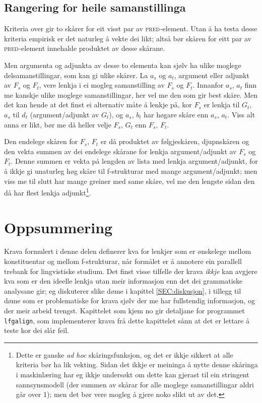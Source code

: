 \documentclass[12pt,a4paper,oneside,draft]{report}
\newcommand{\F}[2]{\textsc{#1}\ensuremath{_{#2}}}
\newcommand{\PRED}{\F{pred}{}}
\begin{document}
\subsection{Rangering for heile samanstillinga}
\label{sec-3.8.3}

Kriteria over gir to skårer for eit visst par av \PRED{}-element. Utan å
ha testa desse kriteria empirisk er det naturleg å vekte dei likt;
altså bør skåren for eitt par av \PRED{}-element innehalde produktet av
desse skårane.

Men argumenta og adjunkta av desse to elementa kan sjølv ha ulike
moglege delsamanstillingar, som kan gi ulike skårer. La $a_s$ og
$a_t$, argument eller adjunkt av $F_s$ og $F_t$, vere lenkja i ei
mogleg samanstilling av $F_s$ og $F_t$. Innanfor $a_s$, $a_t$ finn me
kanskje ulike moglege samanstillingar, her vel me den som gir best
skåre. Men det kan hende at det finst ei alternativ måte å lenkje på,
kor $F_s$ er lenkja til $G_t$, $a_s$ til $d_t$ (argument/adjunkt av
$G_t$), og $a_s$, $b_t$ har høgare skåre enn $a_s$, $a_t$. Viss alt
anna er likt, bør me då heller velje $F_s$, $G_t$ enn $F_s$, $F_t$.

Den endelege skåren for $F_s$, $F_t$ er då produktet av følgjeskåren,
djupnskåren og den vekta summen av dei endelege skårane for lenkja
argument/adjunkt av $F_s$ og $F_t$. Denne summen er vekta på lengden
av lista med lenkja argument/adjunkt, for å ikkje gi unaturleg høg
skåre til f\hyp{}strukturar med mange argument/adjunkt; men viss me til
slutt har mange greiner med same skåre, vel me den lengste sidan den
då har flest lenkja adjunkt\footnote{Dette er ganske \emph{ad hoc} skåringsfunksjon, og det er ikkje
        sikkert at alle kriteria bør ha lik vekting.  Sidan det ikkje
        er meininga å nytte denne skåringa i maskinlæring har eg ikkje
        undersøkt om dette kan gjerast til ein stringent
        sannsynsmodell (der summen av skårar for alle moglege
        samanstillingar aldri går over 1); men det bør vere mogleg å
        gjere noko slikt ut av det. }.



\section{Oppsummering}
\label{sec-3.9}

Krava formulert i denne delen definerer kva for lenkjer som er
ønskelege mellom konstituentar og mellom f\hyp{}strukturar, når formålet er
å annotere ein parallell trebank for lingvistiske studium. Det finst
visse tilfelle der krava \emph{ikkje} kan avgjere kva som er den ideelle
lenkja utan meir informasjon enn det dei grammatiske analysane gir; eg
diskuterer slike døme i kapittel \ref{SEC:diskusjon}, i tillegg til
døme som er problematiske for krava sjølv der me har fullstendig
informasjon, og der meir arbeid trengst. Kapittelet som kjem no gir
detaljane for programmet \texttt{lfgalign}, som implementerer krava frå dette
kapittelet sånn at det er lettare å teste kor dei slår feil.
\end{document}
